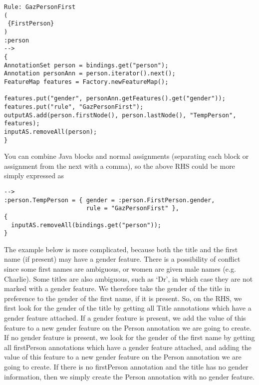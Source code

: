\begin{small}
\begin{verbatim}
Rule: GazPersonFirst
(
 {FirstPerson}
)
:person
-->
{
AnnotationSet person = bindings.get("person");
Annotation personAnn = person.iterator().next();
FeatureMap features = Factory.newFeatureMap();

features.put("gender", personAnn.getFeatures().get("gender"));
features.put("rule", "GazPersonFirst");
outputAS.add(person.firstNode(), person.lastNode(), "TempPerson",
features);
inputAS.removeAll(person);
}
\end{verbatim}
\end{small}

You can combine Java blocks and normal assignments (separating each block or
assignment from the next with a comma), so the above RHS could be more
simply expressed as

\begin{small}
\begin{verbatim}
-->
:person.TempPerson = { gender = :person.FirstPerson.gender,
                       rule = "GazPersonFirst" },
{
  inputAS.removeAll(bindings.get("person"));
}
\end{verbatim}
\end{small}


The example below is more complicated, because both the title and the
first name (if present) may have a gender feature. There is a
possibility of conflict since some first names are ambiguous, or women
are given male names (e.g. Charlie). Some titles are also ambiguous,
such as `Dr', in which case they are not marked with a gender
feature. We therefore take the gender of the title in preference to
the gender of the first name, if it is present. So, on the RHS, we
first look for the gender of the title by getting all Title
annotations which have a gender feature attached. If a gender feature
is present, we add the value of this feature to a new gender feature
on the Person annotation we are going to create. If no gender feature
is present, we look for the gender of the first name by getting all
firstPerson annotations which have a gender feature attached, and adding
the value of this feature to a new gender feature on the Person
annotation we are going to create. If there is no firstPerson
annotation and the title has no gender information, then we simply
create the Person annotation with no gender feature.

